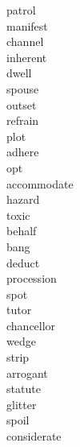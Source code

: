 \documentclass[a4paper, 11pt]{ctexart}
\begin{document}
\begin{multicols*}{3}
\begin{description}
\item[patrol]

\item[manifest]

\item[channel]

\item[inherent]

\item[dwell]

\item[spouse]

\item[outset]

\item[refrain]

\item[plot]

\item[adhere]

\item[opt]

\item[accommodate]

\item[hazard]

\item[toxic]

\item[behalf]

\item[bang]

\item[deduct]

\item[procession]

\item[spot]

\item[tutor]

\item[chancellor]

\item[wedge]

\item[strip]

\item[arrogant]

\item[statute]

\item[glitter]

\item[spoil]

\item[considerate]


\end{description}
\end{multicols*}
\end{document}
